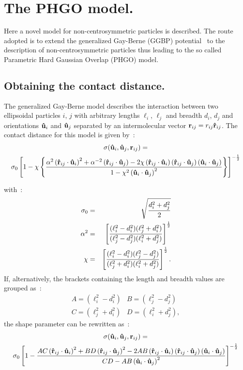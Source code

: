 

\section{The PHGO model.}

Here a novel model for non-centrosymmetric particles is described. The route adopted
is to extend the generalized Gay-Berne (GGBP) potential~\cite{CleaverCare96} to the description of
non-centrosymmetric particles thus leading to the so called Parametric Hard Gaussian Overlap (PHGO)
model.

\subsection{Obtaining the contact distance.}

The generalized Gay-Berne model describes the interaction between two ellipsoidal particles 
$i$, $j$ with arbitrary lengths $\ell_i$, $\ell_j$ and breadth $d_i$, $d_j$ and orientations
$\mathbf{\hat{u} }_i$ and $\mathbf{\hat{u} }_j$ separated by an intermolecular vector $\mathbf{r}_{ij} = r_{ij}\mathbf{\hat{r} }_{ij}$. The contact 
distance for this model is given by~:
%
\begin{multline}
\sigma(\mathbf{\hat{u} }_i,\mathbf{\hat{u} }_j,\mathbf{r}_{ij}) = \\
\sigma_0 \left[ 1 - \chi\left\{
    \frac{\alpha^2\left( \mathbf{\hat{r} }_{ij} \cdot \mathbf{\hat{u} }_i \right)^2 + \alpha^{-2}\left( \mathbf{\hat{r} }_{ij} \cdot \mathbf{\hat{u} }_j \right)
    -2\chi\left( \mathbf{\hat{r} }_{ij} \cdot \mathbf{\hat{u} }_i \right)\left( \mathbf{\hat{r} }_{ij} \cdot \mathbf{\hat{u} }_j \right)\left( \mathbf{\hat{u} }_i \cdot \mathbf{\hat{u} }_j \right)  }{1-\chi^2\left( \mathbf{\hat{u} }_i \cdot \mathbf{\hat{u} }_j \right)^2}
    \right\}\right]^{-\frac{1}{2}}
    \label{eqn:GGB_CD_original}
\end{multline}

with~:
\begin{eqnarray*}
    \sigma_0 &=& \sqrt{\frac{d^2_i + d^2_j}{2}}               \\
    \alpha^2 &=& \left[ \frac{ (\ell^2_i-d^2_i)(\ell^2_j+d^2_i)}
    {(\ell^2_j-d^2_j)(\ell^2_i+d^2_j)}\right]^{\frac{1}{2}}         \\
    \chi &=& \left[ \frac{(\ell^2_i-d^2_i)(\ell^2_j-d^2_j)}
    {(\ell^2_j+d^2_i)(\ell^2_i+d^2_j)}\right]^{\frac{1}{2}}.         \\
\end{eqnarray*}
If, alternatively, the brackets containing the length and breadth values are grouped as~:
%
\begin{equation*}
	\begin{array}{cc}	
	A = (\ell^2_i-d^2_i) &B = (\ell^2_j-d^2_j) \\
	C = (\ell^2_j+d^2_i) &D = (\ell^2_i+d^2_j),
    	\end{array}
\end{equation*}
%
the shape parameter can be rewritten as~:
\begin{multline}
    \sigma(\mathbf{\hat{u} }_i,\mathbf{\hat{u} }_j,\mathbf{r}_{ij}) = \\
    \sigma_0 \left[ 1 - \frac{ AC\left( \mathbf{\hat{r} }_{ij} \cdot \mathbf{\hat{u} }_i \right)^2 + BD\left( \mathbf{\hat{r} }_{ij} \cdot \mathbf{\hat{u} }_j \right)^2
    - 2AB\left( \mathbf{\hat{r} }_{ij} \cdot \mathbf{\hat{u} }_i \right)\left( \mathbf{\hat{r} }_{ij} \cdot \mathbf{\hat{u} }_j \right)\left( \mathbf{\hat{u} }_i \cdot \mathbf{\hat{u} }_j \right) }
    {CD - AB\left( \mathbf{\hat{u} }_i \cdot \mathbf{\hat{u} }_j \right)^2}
    \right]^{-\frac{1}{2}}
    \label{eqn:GGB_CD_modified}
\end{multline}

